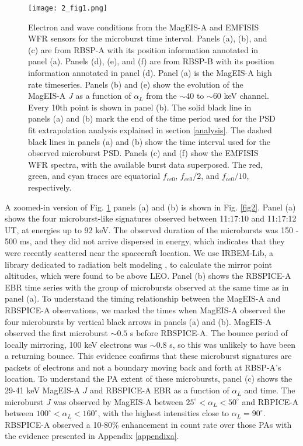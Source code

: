 \begin{figure}
\texttt{[image: 2\_fig1.png]}
\caption{Electron and wave conditions from the MagEIS-A and EMFISIS WFR sensors for the microburst time interval. Panels (a), (b), and (c) are from RBSP-A with its position information annotated in panel (a). Panels (d), (e), and (f) are from RBSP-B with its position information annotated in panel (d). Panel (a) is the MagEIS-A high rate timeseries. Panels (b) and (e) show the evolution of the MagEIS-A $J$ as a function of $\alpha_{L}$ from the ${\sim} 40$ to ${\sim} 60$ keV channel. Every 10th point is shown in panel (b). The solid black line in panels (a) and (b) mark the end of the time period used for the PSD fit extrapolation analysis explained in section \ref{analysis}. The dashed black lines in panels (a) and (b) show the time interval used for the observed microburst PSD. Panels (c) and (f) show the EMFISIS WFR spectra, with the available burst data superposed. The red, green, and cyan traces are equatorial $f_{ce0}$, $f_{ce0}/2$, and $f_{ce0}/10$, respectively. }
\label{fig1}
\end{figure}

A zoomed-in version of Fig. \ref{fig1} panels (a) and (b) is shown in Fig. \ref{fig2}. Panel (a) shows the four microburst-like signatures observed between 11:17:10 and 11:17:12 UT, at energies up to 92 keV. The observed duration of the microbursts was 150 - 500 ms, and they did not arrive dispersed in energy, which indicates that they were recently scattered near the spacecraft location. We use IRBEM-Lib, a library dedicated to radiation belt modeling \citep{irbem}, to calculate the mirror point altitudes, which were found to be above LEO. Panel (b) shows the RBSPICE-A EBR time series with the group of microbursts observed at the same time as in panel (a). To understand the timing relationship between the MagEIS-A and RBSPICE-A observations, we marked the times when MagEIS-A observed the four microbursts by vertical black arrows in panels (a) and (b). MagEIS-A observed the first microburst $\sim 0.5$ s before RBSPICE-A. The bounce period of locally mirroring, 100 keV electrons was $\sim 0.8$ s, so this was unlikely to have been a returning bounce. This evidence confirms that these microburst signatures are packets of electrons and not a boundary moving back and forth at RBSP-A's location. To understand the PA extent of these microbursts, panel (c) shows the 29-41 keV MagEIS-A $J$ and RBSPICE-A EBR as a function of $\alpha_{L}$ and time. The microburst $J$ was observed by MagEIS-A between $25^\circ < \alpha_L < 50^\circ$ and RBPICE-A between $100^\circ < \alpha_L < 160^\circ$, with the highest intensities close to $\alpha_L = 90^\circ$. RBSPICE-A observed a 10-80\% enhancement in count rate over those PAs with the evidence presented in Appendix \ref{appendixa}.

